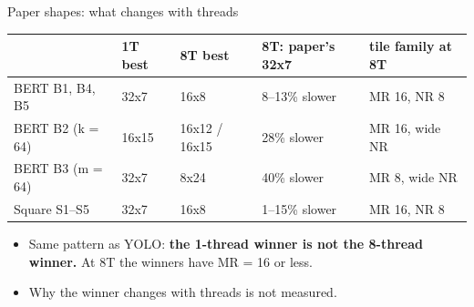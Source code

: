 \begin{frame}{Paper shapes: what changes with threads}\small
\small
\begin{tabular}{@{}lllll@{}}
\toprule
 & 1T best & 8T best & 8T: paper's 32x7 & tile family at 8T \\
\midrule
BERT B1, B4, B5 & 32x7 & 16x8 & 8--13\% slower & MR 16, NR 8 \\
BERT B2 (k = 64) & 16x15 & 16x12 / 16x15 & 28\% slower & MR 16, wide NR \\
BERT B3 (m = 64) & 32x7 & 8x24 & 40\% slower & MR 8, wide NR \\
Square S1--S5 & 32x7 & 16x8 & 1--15\% slower & MR 16, NR 8 \\
\bottomrule
\end{tabular}
\vspace{8pt}
\begin{itemize}\setlength\itemsep{3pt}
\item Same pattern as YOLO: \textbf{the 1-thread winner is not the 8-thread winner.} At 8T the winners have MR = 16 or less.
\item Why the winner changes with threads is not measured.
\end{itemize}
\end{frame}
